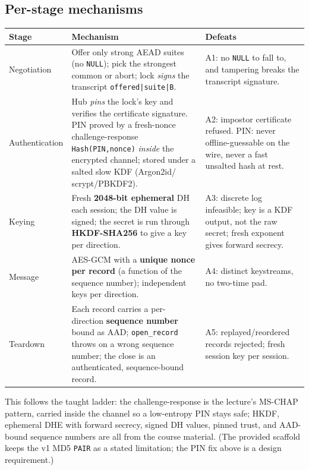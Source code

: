 \documentclass[11pt,a4paper]{article}
\begin{document}
\subsection{Per-stage mechanisms}
\begin{center}
\renewcommand{\arraystretch}{1.25}
\begin{tabular}{@{}p{2.3cm}p{5.2cm}p{6.3cm}@{}}
\toprule
\textbf{Stage} & \textbf{Mechanism} & \textbf{Defeats}\\
\midrule
Negotiation & Offer only strong AEAD suites (no \texttt{NULL}); pick the strongest
common or abort; lock \emph{signs} the transcript \texttt{offered|suite|B}. & A1: no
\texttt{NULL} to fall to, and tampering breaks the transcript signature.\\
Authentication & Hub \emph{pins} the lock's key and verifies the certificate
signature. PIN proved by a fresh-nonce challenge-response \texttt{Hash(PIN,nonce)}
\emph{inside} the encrypted channel; stored under a salted slow KDF (Argon2id/
scrypt/PBKDF2). & A2: impostor certificate refused. PIN: never offline-guessable on
the wire, never a fast unsalted hash at rest.\\
Keying & Fresh \textbf{2048-bit ephemeral} DH each session; the DH value is signed;
the secret is run through \textbf{HKDF-SHA256} to give a key per direction. & A3:
discrete log infeasible; key is a KDF output, not the raw secret; fresh exponent
gives forward secrecy.\\
Message & AES-GCM with a \textbf{unique nonce per record} (a function of the
sequence number); independent keys per direction. & A4: distinct keystreams, no
two-time pad.\\
Teardown & Each record carries a per-direction \textbf{sequence number} bound as
AAD; \texttt{open\_record} throws on a wrong sequence number; the close is an
authenticated, sequence-bound record. & A5: replayed/reordered records rejected;
fresh session key per session.\\
\bottomrule
\end{tabular}
\end{center}

This follows the taught ladder: the challenge-response is the lecture's MS-CHAP
pattern, carried inside the channel so a low-entropy PIN stays safe; HKDF, ephemeral
DHE with forward secrecy, signed DH values, pinned trust, and AAD-bound sequence
numbers are all from the course material. (The provided scaffold keeps the v1 MD5
\texttt{PAIR} as a stated limitation; the PIN fix above is a design requirement.)
\end{document}
